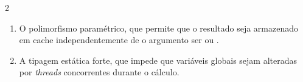 \documentclass[a4paper,10pt,brazil]{article}
\begin{document}
\begin{multicols}{2}
\begin{enumerate}
  \item O polimorfismo paramétrico, que permite que o resultado seja armazenado em cache independentemente de o argumento ser  ou .

  \item A tipagem estática forte, que impede que variáveis globais sejam alteradas por \textit{threads} concorrentes durante o cálculo.


\end{enumerate}


\end{multicols}
\end{document}
